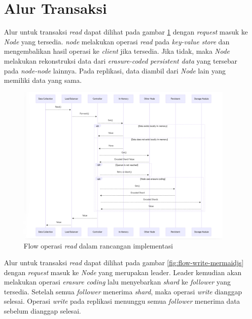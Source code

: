 \section{Alur Transaksi}
\label{sec:system-flow}

Alur untuk transaksi \textit{read} dapat dilihat pada gambar \ref{fig:flow-read-mermaidjs} dengan \textit{request} masuk ke \textit{Node} yang tersedia. \textit{node} melakukan operasi \textit{read} pada \textit{key-value store} dan mengembalikan hasil operasi ke \textit{client} jika tersedia. Jika tidak, maka \textit{Node} melakukan rekonstruksi data dari \textit{erasure-coded persistent data} yang tersebar pada \textit{node-node} lainnya. Pada replikasi, data diambil dari \textit{Node} lain yang memiliki data yang sama.

\begin{figure}[!ht]
    \centering
    \includegraphics[width=0.95\textwidth]{resources/chapter-3/flow-read-mermaidjs.png}
    \caption{Flow operasi \textit{read} dalam rancangan implementasi}
    \label{fig:flow-read-mermaidjs}
\end{figure}

Alur untuk transaksi \textit{read} dapat dilihat pada gambar \ref{fig:flow-write-mermaidjs} dengan \textit{request} masuk ke \textit{Node} yang merupakan leader. Leader kemudian akan melakukan operasi \textit{erasure coding} lalu menyebarkan \textit{shard} ke \textit{follower} yang tersedia. Setelah semua \textit{follower} menerima \textit{shard}, maka operasi \textit{write} dianggap selesai. Operasi \textit{write} pada replikasi menunggu semua \textit{follower} menerima data sebelum dianggap selesai. 

